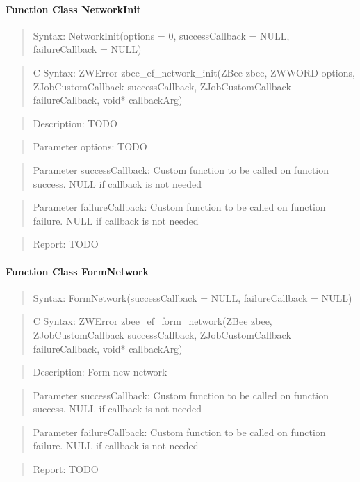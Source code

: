 \paragraph{Function Class NetworkInit}
\begin{quote}Syntax: NetworkInit(options = 0, successCallback = NULL, failureCallback = NULL)\end{quote}
\begin{quote}C Syntax: ZWError zbee\_ef\_network\_init(ZBee zbee, ZWWORD options, ZJobCustomCallback successCallback, ZJobCustomCallback failureCallback, void* callbackArg)\end{quote}
\begin{quote}Description: TODO\end{quote}
\begin{quote}Parameter options: TODO\end{quote}
\begin{quote}Parameter successCallback: Custom function to be called on function success. NULL if callback is not needed\end{quote}
\begin{quote}Parameter failureCallback: Custom function to be called on function failure. NULL if callback is not needed\end{quote}
\begin{quote}Report: TODO\end{quote}

\paragraph{Function Class FormNetwork}
\begin{quote}Syntax: FormNetwork(successCallback = NULL, failureCallback = NULL)\end{quote}
\begin{quote}C Syntax: ZWError zbee\_ef\_form\_network(ZBee zbee, ZJobCustomCallback successCallback, ZJobCustomCallback failureCallback, void* callbackArg)\end{quote}
\begin{quote}Description: Form new network\end{quote}
\begin{quote}Parameter successCallback: Custom function to be called on function success. NULL if callback is not needed\end{quote}
\begin{quote}Parameter failureCallback: Custom function to be called on function failure. NULL if callback is not needed\end{quote}
\begin{quote}Report: TODO\end{quote}

